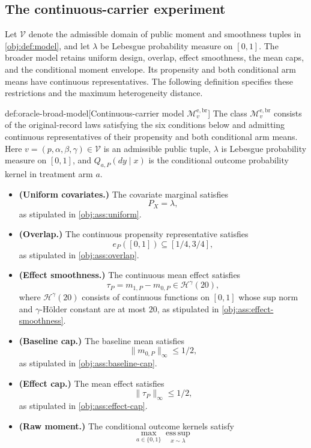 \documentclass[11pt]{article}
\begin{document}
\subsection{The continuous-carrier experiment}

Let \(\mathcal V\) denote the admissible domain of public moment and smoothness tuples in \cref{obj:def:model}, and let \(\lambda\) be Lebesgue probability measure on \([0,1]\). The broader model retains uniform design, overlap, effect smoothness, the mean caps, and the conditional moment envelope. Its propensity and both conditional arm means have continuous representatives. The following definition specifies these restrictions and the maximum heterogeneity distance.

\begin{definitionv}{def:oracle-broad-model}[Continuous-carrier model \(\mathcal M_v^{\mathrm{e,br}}\)]
The class \(\mathcal M_v^{\mathrm{e,br}}\) consists of the original-record laws satisfying the six conditions below and admitting continuous representatives of their propensity and both conditional arm means. Here \(v=(p,\alpha,\beta,\gamma)\in\mathcal V\) is an admissible public tuple, \(\lambda\) is Lebesgue probability measure on \([0,1]\), and \(Q_{a,P}(dy\mid x)\) is the conditional outcome probability kernel in treatment arm \(a\).
\begin{itemize}
\item \textbf{(Uniform covariates.)} The covariate marginal satisfies
\[
 P_X=\lambda,
\]
as stipulated in \cref{obj:ass:uniform}.
\item \textbf{(Overlap.)} The continuous propensity representative satisfies
\[
 e_P([0,1])\subseteq[1/4,3/4],
\]
as stipulated in \cref{obj:ass:overlap}.
\item \textbf{(Effect smoothness.)} The continuous mean effect satisfies
\[
 \tau_P=m_{1,P}-m_{0,P}\in\mathcal H^\gamma(20),
\]
where \(\mathcal H^\gamma(20)\) consists of continuous functions on \([0,1]\) whose sup norm and \(\gamma\)-Hölder constant are at most \(20\), as stipulated in \cref{obj:ass:effect-smoothness}.
\item \textbf{(Baseline cap.)} The baseline mean satisfies
\[
 \|m_{0,P}\|_\infty\le1/2,
\]
as stipulated in \cref{obj:ass:baseline-cap}.
\item \textbf{(Effect cap.)} The mean effect satisfies
\[
 \|\tau_P\|_\infty\le1/2,
\]
as stipulated in \cref{obj:ass:effect-cap}.
\item \textbf{(Raw moment.)} The conditional outcome kernels satisfy
\[
 \max_{a\in\{0,1\}}\operatorname*{ess\,sup}_{x\sim\lambda}
\]
\end{itemize}
\end{definitionv}
\end{document}
